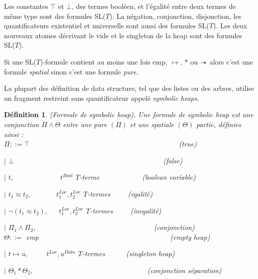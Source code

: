 \documentclass[9pt]{book}
\newcommand\sepimp{\mathrel{-\mkern-6mu*}}
\newtheorem{definition}{D\'efinition}[section]
\begin{document}
	Les constantes $\top$ et $\bot$, des termes bool\'een, et l'\'egalit\'e entre deux termes de m\^eme type sont des formules SL($T$). La n\'egation, conjonction, disjonction, les quantificateurs existentiel et universelle sont aussi des formules SL($T$).
	Les deux nouveaux atomes d\'ecrivant le vide et le singleton de la heap sont des formules SL($T$).\par
	Si une SL($T$)-formule contient au moins une fois emp, $\mapsto$, $*$ ou $\sepimp$ alors c'est une formule \textit{spatial} sinon c'est une formule \textit{pure}.\par
	La plupart des d\'efinition de data structure, tel que des listes ou des arbres, utilise un fragment restreint sans quantificateur appel\'e \textit{symbolic heaps}.
\begin{definition}
(Formule de symbolic heap). Une formule de \textit{symbolic heap} est une conjonction $\Pi\land\Theta$ entre une pure $(\Pi)$ et une spatiale $(\Theta)$ partie, d\'efinies ainsi :\\
$\Pi ::= \top$~~~~~~~~~~~~~~~~~~~~~~~~~~~~~~~~~~~~~~~~~~(true)\par
$|$ $\bot$~~~~~~~~~~~~~~~~~~~~~~~~~~~~~~~~~~~~~~~~~~(false)\par
$|$ $t,$~~~~~~~~~~~~~$t^{Bool}$ $T$-terme~~~~~~~~~~~~(boolean variable)\par
$|$ $t_{1}\approx t_{2},$~~~~~~~$t^{Loc}_{1},t^{Loc}_{2}$ $T$-termes~~~~~(egalit\'e)\par
$|$ $\neg(t_{1}\approx t_{2}),$~~~$t^{Loc}_{1},t^{Loc}_{2}$ $T$-termes~~~~~(inegalit\'e)\par
$|$ $\Pi_{1}\land\Pi_{2},$~~~~~~~~~~~~~~~~~~~~~~~~~~~~~~~~~(conjonction)\\
$\Theta ::=$ emp~~~~~~~~~~~~~~~~~~~~~~~~~~~~~~~~~~~~~(empty heap)\par
$|$ $t\mapsto u,$~~~~~$t^{Loc},u^{Data}$ $T$-termes~~~~~~(singleton heap)\par
$|$ $\Theta_{1}*\Theta_{2},$~~~~~~~~~~~~~~~~~~~~~~~~~~~~~~~~(conjonction s\'eparation)
\end{definition}
\end{document}
